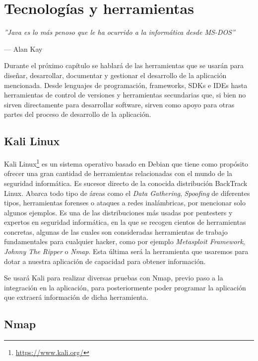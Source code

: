 \chapter{Tecnologías y herramientas}

\epigraph{\textit{''Java es lo más penoso que le ha ocurrido a la informática desde MS-DOS''}}{--- Alan Kay}

Durante el próximo capítulo se hablará de las herramientas que se usarán para diseñar, desarrollar, documentar y gestionar el desarrollo de la aplicación mencionada. Desde lenguajes de programación, frameworks, SDKs e IDEs hasta herramientas de control de versiones y herramientas secundarias que, si bien no sirven directamente para desarrollar software, sirven como apoyo para otras partes del proceso de desarrollo de la aplicación.

\section{Kali Linux}

Kali Linux\footnote{\url{https://www.kali.org/}} es un sistema operativo basado en Debian que tiene como propósito ofrecer una gran cantidad de herramientas relacionadas con el mundo de la seguridad informática. Es sucesor directo de la conocida distribución BackTrack Linux. Abarca todo tipo de áreas como el \textit{Data Gathering}, \textit{Spoofing} de diferentes tipos, herramientas forenses o ataques a redes inalámbricas, por mencionar solo algunos ejemplos. Es una de las distribuciones más usadas por pentesters y expertos en seguridad informática, en la que se recogen cientos de herramientas concretas, algunas de las cuales son consideradas herramientas de trabajo fundamentales para cualquier hacker, como por ejemplo \textit{Metasploit Framework}, \textit{Johnny The Ripper} o \textit{Nmap}. Esta última será la herramienta que usaremos para dotar a nuestra aplicación de capacidad para obtener información.

Se usará Kali para realizar diversas pruebas con Nmap, previo paso a la integración en la aplicación, para posteriormente poder programar la aplicación que extraerá información de dicha herramienta.


\section{Nmap}

